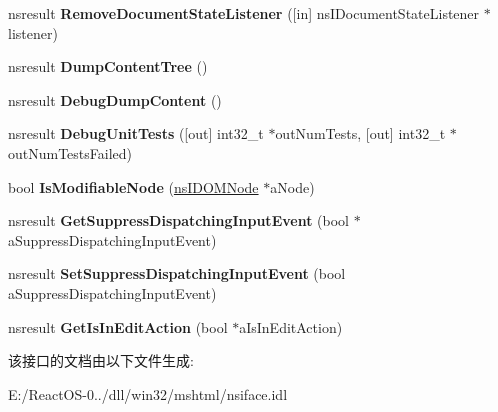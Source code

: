 \begin{DoxyCompactItemize}
\item 
\mbox{\label{interfacens_i_editor_a9f44634a41bb12ff5c75933515380ca3}} 
nsresult {\bfseries Remove\+Document\+State\+Listener} (\mbox{[}in\mbox{]} ns\+I\+Document\+State\+Listener $\ast$listener)
\item 
\mbox{\label{interfacens_i_editor_ad6352c92ca3560354c4ae072fba3552c}} 
nsresult {\bfseries Dump\+Content\+Tree} ()
\item 
\mbox{\label{interfacens_i_editor_a516dcb0d556ce807f0712e41995fd481}} 
nsresult {\bfseries Debug\+Dump\+Content} ()
\item 
\mbox{\label{interfacens_i_editor_aca9ee4a175e3208b14ff990feda5b697}} 
nsresult {\bfseries Debug\+Unit\+Tests} (\mbox{[}out\mbox{]} int32\+\_\+t $\ast$out\+Num\+Tests, \mbox{[}out\mbox{]} int32\+\_\+t $\ast$out\+Num\+Tests\+Failed)
\item 
\mbox{\label{interfacens_i_editor_a2c3282f8c67baea6ea57f0f070a6dc79}} 
bool {\bfseries Is\+Modifiable\+Node} (\hyperlink{interfacens_i_d_o_m_node}{ns\+I\+D\+O\+M\+Node} $\ast$a\+Node)
\item 
\mbox{\label{interfacens_i_editor_ac8872f6dd61512cbfdbd397374da4fdb}} 
nsresult {\bfseries Get\+Suppress\+Dispatching\+Input\+Event} (bool $\ast$a\+Suppress\+Dispatching\+Input\+Event)
\item 
\mbox{\label{interfacens_i_editor_a01ca4b3ae6b505d6d52cdc1fa41dc203}} 
nsresult {\bfseries Set\+Suppress\+Dispatching\+Input\+Event} (bool a\+Suppress\+Dispatching\+Input\+Event)
\item 
\mbox{\label{interfacens_i_editor_a47d3be711b5e4bb536a119f9a077ce07}} 
nsresult {\bfseries Get\+Is\+In\+Edit\+Action} (bool $\ast$a\+Is\+In\+Edit\+Action)
\end{DoxyCompactItemize}


该接口的文档由以下文件生成\+:\begin{DoxyCompactItemize}
\item 
E\+:/\+React\+O\+S-\/0../dll/win32/mshtml/nsiface.\+idl\end{DoxyCompactItemize}

